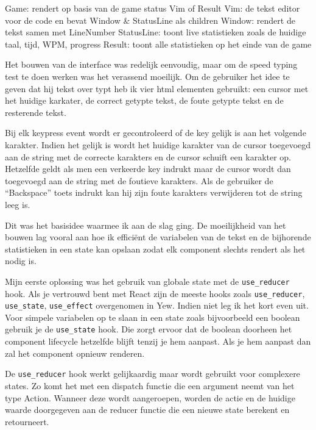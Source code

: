 Game: rendert op basis van de game status Vim of Result 
Vim: de tekst editor voor de code en bevat Window \& StatusLine als children 
Window: rendert de tekst samen met LineNumber 
StatusLine: toont live statistieken zoals de huidige taal, tijd, WPM, progress 
Result: toont alle statistieken op het einde van de game

\clearpage

Het bouwen van de interface was redelijk eenvoudig, maar om de speed typing test te doen werken was
het verassend moeilijk. Om de gebruiker het idee te geven dat hij tekst over typt heb ik vier html
elementen gebruikt: een cursor met het huidige karkater, de correct getypte tekst, de foute getypte
tekst en de resterende tekst.

Bij elk keypress event wordt er gecontroleerd of de key gelijk is aan het volgende karakter. Indien
het gelijk is wordt het huidige karakter van de cursor toegevoegd aan de string met de correcte
karakters en de cursor schuift een karakter op. Hetzelfde geldt als men een verkeerde key indrukt
maar de cursor wordt dan toegevoegd aan de string met de foutieve karakters. Als de gebruiker de
“Backspace” toets indrukt kan hij zijn foute karakters verwijderen tot de string leeg is. 

Dit was het basisidee waarmee ik aan de slag ging. De moeilijkheid van het bouwen lag vooral aan hoe
ik efficiënt de variabelen van de tekst en de bijhorende statistieken in een state kan opslaan zodat
elk component slechts rendert als het nodig is.  

Mijn eerste oplossing was het gebruik van globale state met de \texttt{use_reducer}
hook. Als je vertrouwd bent met React zijn de meeste hooks zoals \texttt{use_reducer},
\texttt{use_state}, \texttt{use_effect} overgenomen in Yew. Indien niet leg
ik het kort even uit. Voor simpele variabelen op te slaan in een state zoals bijvoorbeeld een
boolean gebruik je de \texttt{use_state} hook. Die zorgt ervoor dat de boolean doorheen
het component lifecycle hetzelfde blijft tenzij je hem aanpast. Als je hem aanpast dan zal het
component opnieuw renderen.  

De \texttt{use_reducer} hook werkt gelijkaardig maar wordt gebruikt voor complexere
states. Zo komt het met een dispatch functie die een argument neemt van het type Action. Wanneer
deze wordt aangeroepen, worden de actie en de huidige waarde doorgegeven aan de reducer functie die
een nieuwe state berekent en retourneert.

